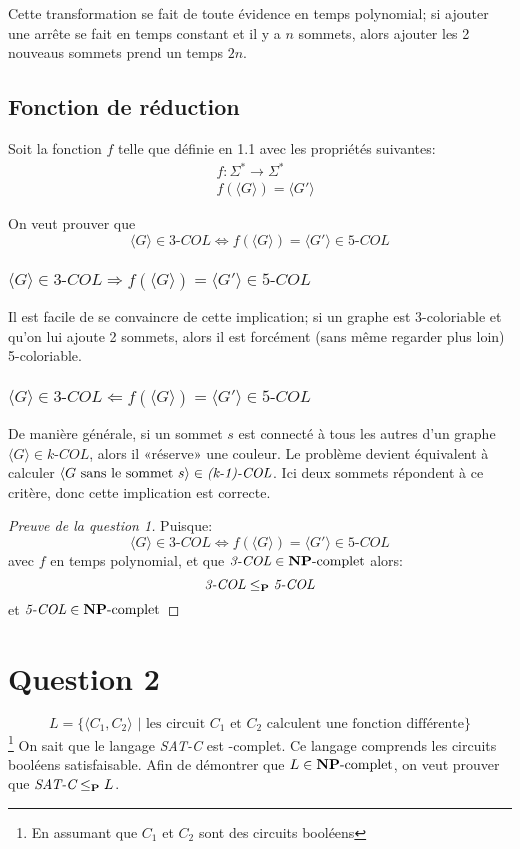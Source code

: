 \documentclass{article}
\newcommand\NP{{\normalfont{\textbf{NP}}}}
\newcommand\PP{{\normalfont{\textbf{P}}}}
\newcommand\col[1]{\textit{#1-COL}}
\newcommand\SC{\textit{SAT-C}}
\newcommand\bk[1]{\langle #1 \rangle}
\begin{document}
Cette transformation se fait de toute évidence en temps polynomial; si ajouter une arrête se fait en temps constant et il y a $n$ sommets, alors ajouter les 2 nouveaus sommets prend un temps $2n$.

\subsection{Fonction de réduction}
Soit la fonction $f$ telle que définie en 1.1 avec les propriétés suivantes:
\begin{align*}
  &f: \Sigma^* \rightarrow \Sigma^* \\
  &f(\bk{G}) = \bk{G'}
\end{align*}

On veut prouver que $$\bk{G} \in \col{3} \Leftrightarrow f(\bk{G}) = \bk{G'} \in \col{5}$$

\subsubsection{\normalfont $\bk{G} \in \col{3} \Rightarrow f(\bk{G}) = \bk{G'} \in \col{5}$}
Il est facile de se convaincre de cette implication; si un graphe est 3-coloriable et qu'on lui ajoute 2 sommets, alors il est forcément (sans même regarder plus loin) 5-coloriable.

\subsubsection{\normalfont $\bk{G} \in \col{3} \Leftarrow f(\bk{G}) = \bk{G'} \in \col{5}$}
De manière générale, si un sommet $s$ est connecté à tous les autres d'un graphe $\bk{G} \in \col{k}$, alors il «réserve» une couleur. Le problème devient équivalent à calculer $\bk{G \text{ sans le sommet } s} \in \col{\text{(k-1)}}$. Ici deux sommets répondent à ce critère, donc cette implication est correcte.

\begin{proof}[Preuve de la question 1]
  Puisque:
  $$\bk{G} \in \col{3} \Leftrightarrow f(\bk{G}) = \bk{G'} \in \col{5}$$
  avec $f$ en temps polynomial, et que $\col{3} \in \text{\NP-complet}$
  alors:
  $$\col{3} \leq_\PP \col{5}$$
  et $\col{5} \in \text{\NP-complet}$
\end{proof}

\pagebreak

\section{Question 2}
$$L = \{\bk{C_1, C_2} \text{  | les circuit $C_1$ et $C_2$ calculent une fonction différente} \}$$
\footnote{En assumant que $C_1$ et $C_2$ sont des circuits booléens} On sait que le langage \SC{} est \NP-complet. Ce langage comprends les circuits booléens satisfaisable. Afin de démontrer que $L \in \text{\NP-complet}$, on veut prouver que $\SC \leq_\PP L$.
\end{document}

